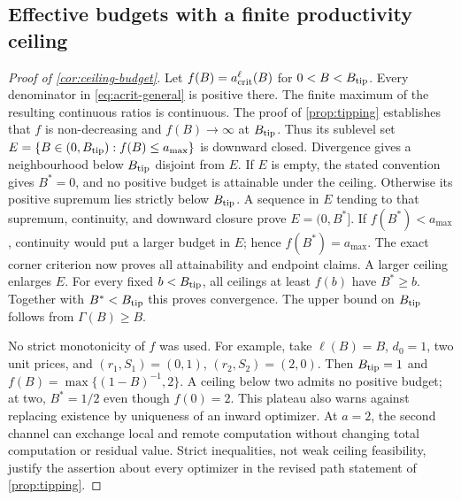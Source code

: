\subsection{Effective budgets with a finite productivity ceiling}
\label{app:ceiling-budget-proof}
\begin{proof}[Proof of \cref{cor:ceiling-budget}]
Let $f(B)=a_{\rm crit}^{\ell}(B)$ for $0<B<B_{\rm tip}$.
Every denominator in \cref{eq:acrit-general} is positive there.
The finite maximum of the resulting continuous ratios is continuous.
The proof of \cref{prop:tipping} establishes that $f$ is non-decreasing
and $f(B)\to\infty$ at $B_{\rm tip}$. Thus its sublevel set
$E=\{B\in(0,B_{\rm tip}):f(B)\leq a_{\max}\}$ is downward closed.
Divergence gives a neighbourhood below $B_{\rm tip}$ disjoint from $E$.
If $E$ is empty, the stated convention gives $B^*=0$, and no positive
budget is attainable under the ceiling. Otherwise its positive supremum
lies strictly below $B_{\rm tip}$. A sequence in $E$ tending to that
supremum, continuity, and downward closure prove $E=(0,B^*]$.
If $f(B^*)<a_{\max}$, continuity would put a larger budget in $E$;
hence $f(B^*)=a_{\max}$. The exact corner criterion now proves all
attainability and endpoint claims. A larger ceiling enlarges $E$.
For every fixed $b<B_{\rm tip}$, all ceilings at least $f(b)$ have
$B^*\geq b$. Together with $B^*<B_{\rm tip}$ this proves convergence.
The upper bound on $B_{\rm tip}$ follows from $\Gamma(B)\geq B$.

No strict monotonicity of $f$ was used. For example, take $\ell(B)=B$,
$d_0=1$, two unit prices, and $(r_1,S_1)=(0,1)$,
$(r_2,S_2)=(2,0)$. Then $B_{\rm tip}=1$ and
$f(B)=\max\{(1-B)^{-1},2\}$. A ceiling below two admits no positive
budget; at two, $B^*=1/2$ even though $f(0)=2$. This plateau also
warns against replacing existence by uniqueness of an inward optimizer.
At $a=2$, the second channel can exchange local and remote computation
without changing total computation or residual value. Strict inequalities,
not weak ceiling feasibility, justify the assertion about every optimizer
in the revised path statement of \cref{prop:tipping}.
\end{proof}

